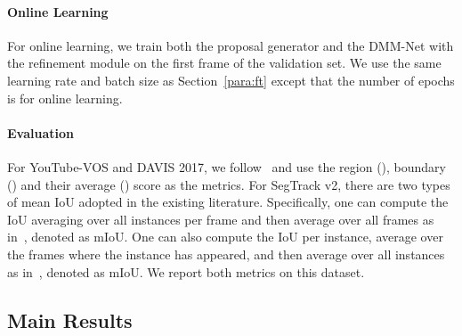 \paragraph{Online Learning}
For online learning, we train both the proposal generator and the DMM-Net with the refinement module on the first frame of the validation set. We use the same learning rate and batch size as  Section~\ref{para:ft} except that the number of epochs is  for online learning. 

\paragraph{Evaluation}
For YouTube-VOS and DAVIS 2017, we follow~\cite{pont2017} and use the region (), boundary () and their average () score as the metrics.
For SegTrack v2, there are two types of mean IoU adopted in the existing literature. 
Specifically, one can compute the IoU averaging over all instances per frame and then average over all frames as in~\cite{hu2017maskrnn}, denoted as mIoU.
One can also compute the IoU per instance, average over the frames where the instance has appeared, and then average over all instances as in~\cite{li2018video}, denoted as mIoU. 
We report both metrics on this dataset.

\subsection{Main Results}



